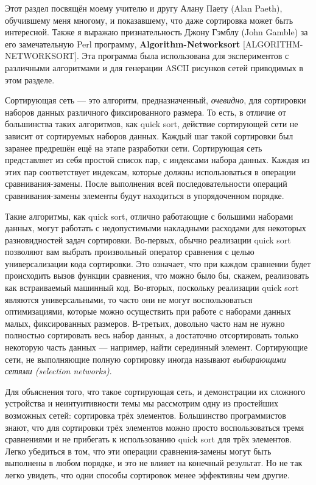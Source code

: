 Этот раздел посвящён моему учителю и другу Алану Паету (Alan Paeth), обучившему меня многому, и показавшему, что даже сортировка может быть интересной. Также я выражаю признательность Джону Гэмблу (John Gamble) за его замечательную Perl программу, \textbf{Algorithm-Networksort} [ALGORITHM-NETWORKSORT]. Эта программа была использована для экспериментов с различными алгоритмами и для генерации ASCII рисунков сетей приводимых в этом разделе.

Сортирующая сеть --- это алгоритм, предназначенный, \emph{очевидно}, для сортировки наборов данных различного фиксированного размера. То есть, в отличие от большинства таких алгоритмов, как quick sort, действие сортирующей сети не зависит от сортируемых наборов данных. Каждый шаг такой сортировки был заранее предрешён ещё на этапе разработки сети. Сортирующая сеть представляет из себя простой список пар, с индексами набора данных. Каждая из этих пар соответствует индексам, которые должны использоваться в операции срав\-ни\-ва\-ния-за\-ме\-ны. После выполнения всей последовательности операций срав\-ни\-ва\-ния-за\-ме\-ны элементы будут находиться в упорядоченном порядке.

Такие алгоритмы, как quick sort, отлично работающие с большими наборами данных, могут работать с недопустимыми накладными расходами для некоторых разновидностей задач сортировки. Во-первых, обычно реализации quick sort позволяют вам выбрать произвольный оператор сравнения с целью универсализации кода сортировки. Это означает, что при каждом сравнении будет происходить вызов функции сравнения, что можно было бы, скажем, реализовать как встраиваемый машинный код. Во-вторых, поскольку реализации quick sort являются универсальными, то часто они не могут воспользоваться оптимизациями, которые можно осуществить при работе с наборами данных малых, фиксированных размеров. В-третьих, довольно часто нам не нужно полностью сортировать весь набор данных, а достаточно отсортировать только некоторую часть данных --- например, найти серединный элемент. Сортирующие сети, не выполняющие полную сортировку иногда называют \emph{выбирающими сетями (selection networks)}.

Для объяснения того, что такое сортирующая сеть, и демонстрации их сложного устройства и неинтуитивности темы мы рассмотрим одну из простейших возможных сетей: сортировка трёх элементов. Большинство программистов знают, что для сортировки трёх элементов можно просто воспользоваться тремя сравнениями и не прибегать к использованию quick sort для трёх элементов. Легко убедиться в том, что эти операции сравнения-замены могут быть выполнены в любом порядке, и это не влияет на конечный результат. Но не так легко увидеть, что одни способы сортировок менее эффективны чем другие.

